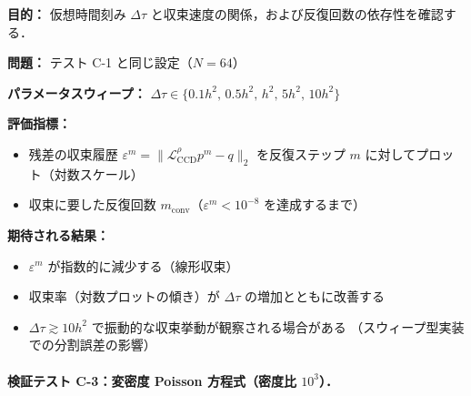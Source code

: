 \begin{tcolorbox}[algbox, title={テスト C-2 の設定}]
\textbf{目的：} 仮想時間刻み $\Delta\tau$ と収束速度の関係，および反復回数の依存性を確認する．

\textbf{問題：} テスト C-1 と同じ設定（$N=64$）

\textbf{パラメータスウィープ：}
$\Delta\tau \in \{0.1h^2,\, 0.5h^2,\, h^2,\, 5h^2,\, 10h^2\}$

\textbf{評価指標：}
\begin{itemize}
  \item 残差の収束履歴 $\varepsilon^m = \|\mathcal{L}_{\mathrm{CCD}}^{\rho}p^m - q\|_2$
        を反復ステップ $m$ に対してプロット（対数スケール）
  \item 収束に要した反復回数 $m_{\mathrm{conv}}$（$\varepsilon^m < 10^{-8}$ を達成するまで）
\end{itemize}

\textbf{期待される結果：}
\begin{itemize}
  \item $\varepsilon^m$ が指数的に減少する（線形収束）
  \item 収束率（対数プロットの傾き）が $\Delta\tau$ の増加とともに改善する
  \item $\Delta\tau \gtrsim 10h^2$ で振動的な収束挙動が観察される場合がある
        （スウィープ型実装での分割誤差の影響）
\end{itemize}
\end{tcolorbox}

\paragraph{検証テスト C-3：変密度 Poisson 方程式（密度比 \texorpdfstring{$10^3$}{10\textasciicircum 3}）．}
\label{sec:ccd_test_c3}


